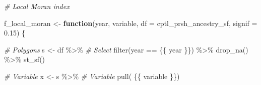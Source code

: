 \documentclass[
  12pt,
]{article}
\newenvironment{Shaded}{\begin{snugshade}}{\end{snugshade}}
\newcommand{\AttributeTok}[1]{\textcolor[rgb]{0.77,0.63,0.00}{#1}}
\newcommand{\CommentTok}[1]{\textcolor[rgb]{0.56,0.35,0.01}{\textit{#1}}}
\newcommand{\ControlFlowTok}[1]{\textcolor[rgb]{0.13,0.29,0.53}{\textbf{#1}}}
\newcommand{\FloatTok}[1]{\textcolor[rgb]{0.00,0.00,0.81}{#1}}
\newcommand{\FunctionTok}[1]{\textcolor[rgb]{0.00,0.00,0.00}{#1}}
\newcommand{\NormalTok}[1]{#1}
\newcommand{\OtherTok}[1]{\textcolor[rgb]{0.56,0.35,0.01}{#1}}
\newcommand{\SpecialCharTok}[1]{\textcolor[rgb]{0.00,0.00,0.00}{#1}}
\begin{document}
\begin{Shaded}
\begin{Highlighting}[]
\CommentTok{\# Local Moran index}

\NormalTok{f\_local\_moran }\OtherTok{\textless{}{-}} \ControlFlowTok{function}\NormalTok{(year, }
\NormalTok{                          variable, }
                          \AttributeTok{df =}\NormalTok{ cptl\_prsh\_ancestry\_sf, }
                          \AttributeTok{signif =} \FloatTok{0.15}\NormalTok{) \{ }
  
  \CommentTok{\# Polygons}
\NormalTok{  s }\OtherTok{\textless{}{-}}\NormalTok{ df }\SpecialCharTok{\%\textgreater{}\%}
    \CommentTok{\# Select}
    \FunctionTok{filter}\NormalTok{(year }\SpecialCharTok{==}\NormalTok{ \{\{ year \}\}) }\SpecialCharTok{\%\textgreater{}\%} 
    \FunctionTok{drop\_na}\NormalTok{() }\SpecialCharTok{\%\textgreater{}\%} 
    \FunctionTok{st\_sf}\NormalTok{() }
  
  \CommentTok{\# Variable}
\NormalTok{  x }\OtherTok{\textless{}{-}}\NormalTok{ s }\SpecialCharTok{\%\textgreater{}\%} 
    \CommentTok{\# Variable}
    \FunctionTok{pull}\NormalTok{( \{\{ variable \}\}) }
  

\end{Highlighting}
\end{Shaded}
\end{document}
